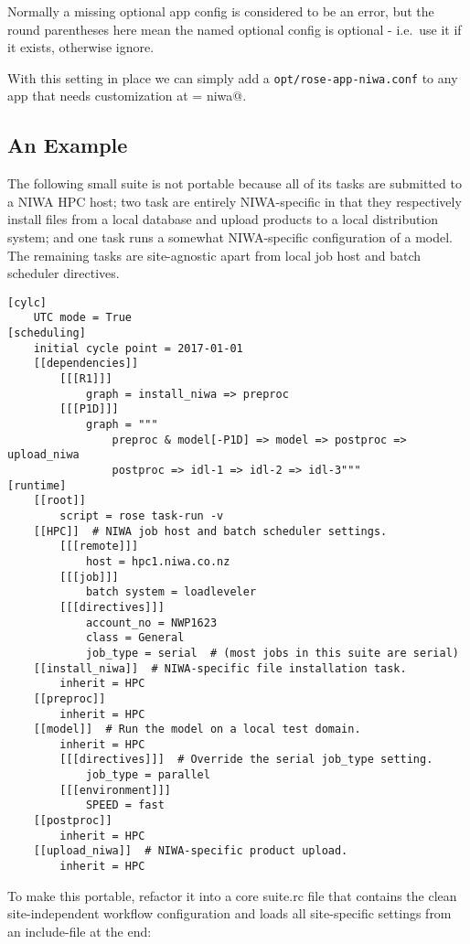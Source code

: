 Normally a missing optional app config is considered to be an error, but the 
round parentheses here mean the named optional config is optional - i.e.\
use it if it exists, otherwise ignore.

With this setting in place we can simply add a
\lstinline=opt/rose-app-niwa.conf= to any app that needs customization at
\lstinline@SITE = niwa@.

\subsection{An Example}

The following small suite is not portable because all of its tasks are
submitted to a NIWA HPC host; two task are entirely NIWA-specific in that they 
respectively install files from a local database and upload products to a local
distribution system; and one task runs a somewhat NIWA-specific configuration
of a model. The remaining tasks are site-agnostic apart from local job host
and batch scheduler directives.

\lstset{language=suiterc}
\begin{lstlisting}
[cylc]
    UTC mode = True
[scheduling]
    initial cycle point = 2017-01-01
    [[dependencies]]
        [[[R1]]]
            graph = install_niwa => preproc
        [[[P1D]]]
            graph = """
                preproc & model[-P1D] => model => postproc => upload_niwa
                postproc => idl-1 => idl-2 => idl-3"""
[runtime]
    [[root]]
        script = rose task-run -v
    [[HPC]]  # NIWA job host and batch scheduler settings.
        [[[remote]]]
            host = hpc1.niwa.co.nz
        [[[job]]]
            batch system = loadleveler
        [[[directives]]]
            account_no = NWP1623
            class = General
            job_type = serial  # (most jobs in this suite are serial)
    [[install_niwa]]  # NIWA-specific file installation task.
        inherit = HPC
    [[preproc]]
        inherit = HPC
    [[model]]  # Run the model on a local test domain.
        inherit = HPC
        [[[directives]]]  # Override the serial job_type setting.
            job_type = parallel
        [[[environment]]]
            SPEED = fast
    [[postproc]]
        inherit = HPC
    [[upload_niwa]]  # NIWA-specific product upload.
        inherit = HPC
\end{lstlisting}

To make this portable, refactor it into a core suite.rc file that contains the
clean site-independent workflow configuration and loads all site-specific
settings from an include-file at the end:

